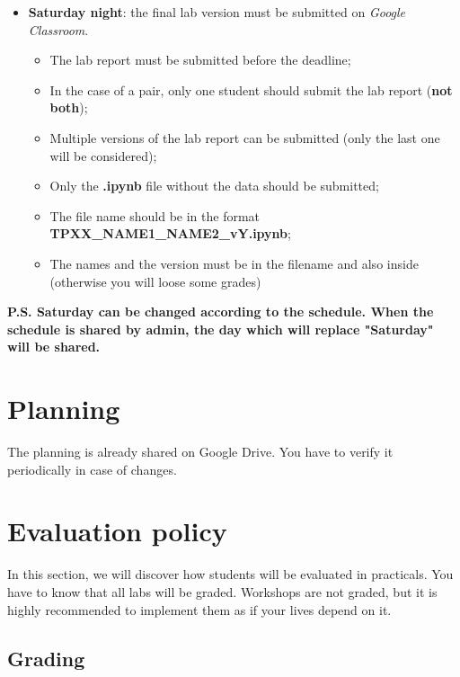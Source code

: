 \documentclass[11pt, a4paper]{article}
\begin{document}
\begin{itemize}
	\item \textbf{Saturday night}: the final lab version must be submitted on \textit{Google Classroom}.
	\begin{itemize}
		\item The lab report must be submitted before the deadline;
		\item In the case of a pair, only one student should submit the lab report (\textbf{not both});
		\item Multiple versions of the lab report can be submitted (only the last one will be considered);
		\item Only the \textbf{.ipynb} file without the data should be submitted;
		\item The file name should be in the format \textbf{TPXX\_NAME1\_NAME2\_vY.ipynb};
		\item The names and the version must be in the filename and also inside (otherwise you will loose some grades)
	\end{itemize}

\end{itemize}

\textbf{\color{red}P.S. Saturday can be changed according to the schedule. When the schedule is shared by admin, the day which will replace "Saturday" will be shared.}


\section{Planning}

The planning is already shared on Google Drive. 
You have to verify it periodically in case of changes.

\section{Evaluation policy}

In this section, we will discover how students will be evaluated in practicals.
You have to know that all labs will be graded.
Workshops are not graded, but it is highly recommended to implement them as if your lives depend on it.

\subsection{Grading}
\end{document}
